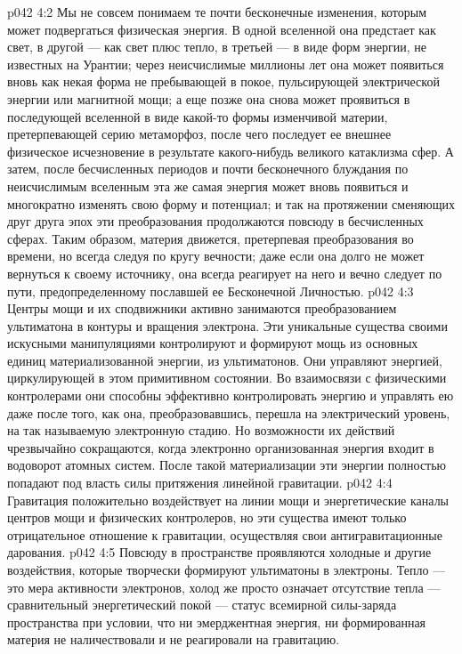 \vs p042 4:2 Мы не совсем понимаем те почти бесконечные изменения, которым может подвергаться физическая энергия. В одной вселенной она предстает как свет, в другой --- как свет плюс тепло, в третьей --- в виде форм энергии, не известных на Урантии; через неисчислимые миллионы лет она может появиться вновь как некая форма не пребывающей в покое, пульсирующей электрической энергии или магнитной мощи; а еще позже она снова может проявиться в последующей вселенной в виде какой\hyp{}то формы изменчивой материи, претерпевающей серию метаморфоз, после чего последует ее внешнее физическое исчезновение в результате какого\hyp{}нибудь великого катаклизма сфер. А затем, после бесчисленных периодов и почти бесконечного блуждания по неисчислимым вселенным эта же самая энергия может вновь появиться и многократно изменять свою форму и потенциал; и так на протяжении сменяющих друг друга эпох эти преобразования продолжаются повсюду в бесчисленных сферах. Таким образом, материя движется, претерпевая преобразования во времени, но всегда следуя по кругу вечности; даже если она долго не может вернуться к своему источнику, она всегда реагирует на него и вечно следует по пути, предопределенному пославшей ее Бесконечной Личностью.
\vs p042 4:3 Центры мощи и их сподвижники активно занимаются преобразованием ультиматона в контуры и вращения электрона. Эти уникальные существа своими искусными манипуляциями контролируют и формируют мощь из основных единиц материализованной энергии, из ультиматонов. Они управляют энергией, циркулирующей в этом примитивном состоянии. Во взаимосвязи с физическими контролерами они способны эффективно контролировать энергию и управлять ею даже после того, как она, преобразовавшись, перешла на электрический уровень, на так называемую электронную стадию. Но возможности их действий чрезвычайно сокращаются, когда электронно организованная энергия входит в водоворот атомных систем. После такой материализации эти энергии полностью попадают под власть силы притяжения линейной гравитации.
\vs p042 4:4 Гравитация положительно воздействует на линии мощи и энергетические каналы центров мощи и физических контролеров, но эти существа имеют только отрицательное отношение к гравитации, осуществляя свои антигравитационные дарования.
\vs p042 4:5 Повсюду в пространстве проявляются холодные и другие воздействия, которые творчески формируют ультиматоны в электроны. Тепло --- это мера активности электронов, холод же просто означает отсутствие тепла --- сравнительный энергетический покой --- статус всемирной силы\hyp{}заряда пространства при условии, что ни эмерджентная энергия, ни формированная материя не наличествовали и не реагировали на гравитацию.
